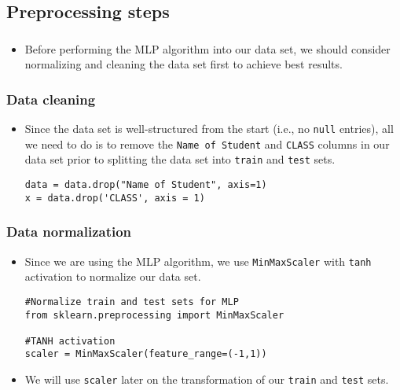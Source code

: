 \subsection{Preprocessing steps}
\begin{frame}
\frametitle{\subsecname}
	\begin{itemize}
		\item Before performing the MLP algorithm into our data set, we should consider normalizing and cleaning the data set first to achieve best results.
	\end{itemize}
\end{frame}

\begin{frame}[fragile]
\frametitle{Data cleaning}
	\begin{itemize}
		\item Since the data set is well-structured from the start (i.e., no \texttt{null} entries), all we need to do is to remove the \texttt{Name of Student} and \texttt{CLASS} columns in our data set prior to splitting the data set into \texttt{train} and \texttt{test} sets. 
\begin{verbatim}
data = data.drop("Name of Student", axis=1)
x = data.drop('CLASS', axis = 1)
\end{verbatim}
	\end{itemize}
\end{frame}

\begin{frame}[fragile]
\frametitle{Data normalization}
	\begin{itemize}
		\item Since we are using the MLP algorithm, we use \texttt{MinMaxScaler} with \texttt{tanh} activation to normalize our data set.
\begin{verbatim}
#Normalize train and test sets for MLP
from sklearn.preprocessing import MinMaxScaler

#TANH activation
scaler = MinMaxScaler(feature_range=(-1,1))
\end{verbatim}
		\item We will use \texttt{scaler} later on the transformation of our \texttt{train} and \texttt{test} sets.
	\end{itemize}
\end{frame}
